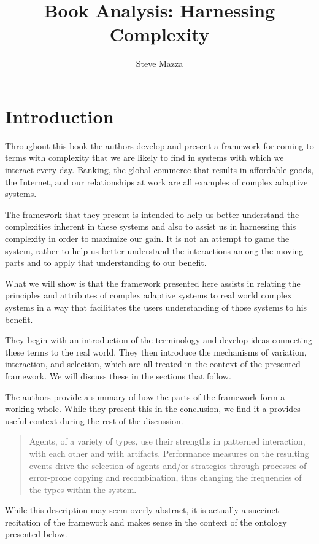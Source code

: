 \documentclass[jou,apacite]{apa6}
\title{Book Analysis: Harnessing Complexity}
\author{Steve Mazza}
\affiliation{Naval Postgraduate School}
\begin{document}
\maketitle    
                        
\section{Introduction}
Throughout this book the authors develop and present a framework for coming to terms with complexity that we are likely to find in systems with which we interact every day.  Banking, the global commerce that results in affordable goods, the Internet, and our relationships at work are all examples of complex adaptive systems.

The framework that they present is intended to help us better understand the complexities inherent in these systems and also to assist us in harnessing this complexity in order to maximize our gain.  It is not an attempt to game the system, rather to help us better understand the interactions among the moving parts and to apply that understanding to our benefit.

What we will show is that the framework presented here assists in relating the principles and attributes of complex adaptive systems to real world complex systems in a way that facilitates the users understanding of those systems to his benefit.

They begin with an introduction of the terminology and develop ideas connecting these terms to the real world.  They then introduce the mechanisms of variation, interaction, and selection, which are all treated in the context of the presented framework.  We will discuss these in the sections that follow.

The authors provide a summary of how the parts of the framework form a working whole.  While they present this in the conclusion, we find it a provides useful context during the rest of the discussion.
\begin{quote}
  Agents, of a variety of types, use their strengths in patterned interaction, with each other and with artifacts.  Performance measures on the resulting events drive the selection of agents and/or strategies through processes of error-prone copying and recombination, thus changing the frequencies of the types within the system.~\cite[page 154]{Axelrod}
\end{quote}
While this description may seem overly abstract, it is actually a succinct recitation of the framework and makes sense in the context of the ontology presented below.
\end{document}
